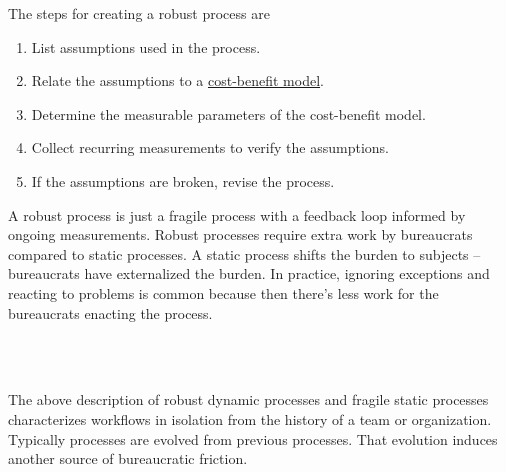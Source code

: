 The steps for creating a robust process are
\begin{enumerate}
    \item List assumptions used in the process. 
    \item Relate the assumptions to a \href{https://en.wikipedia.org/wiki/Cost\%E2\%80\%93benefit_analysis}{cost-benefit model}.
    \item Determine the measurable parameters of the cost-benefit model. 
    \item Collect recurring measurements to verify the assumptions. 
    \item If the assumptions are broken, revise the process. 
\end{enumerate}
A robust process is just a fragile process with a feedback loop informed by ongoing measurements. Robust processes require extra work by bureaucrats compared to static processes. A static process shifts the burden to subjects -- bureaucrats have externalized the burden.
In practice, ignoring exceptions and reacting to problems is common because then there's less work for the bureaucrats enacting the process. 

\ \\

\noindent\hrulefill

\ \\

The above description of robust dynamic processes and fragile static processes characterizes workflows in isolation from the history of a team or organization. Typically processes are evolved from previous processes.  That evolution induces another source of bureaucratic friction. 